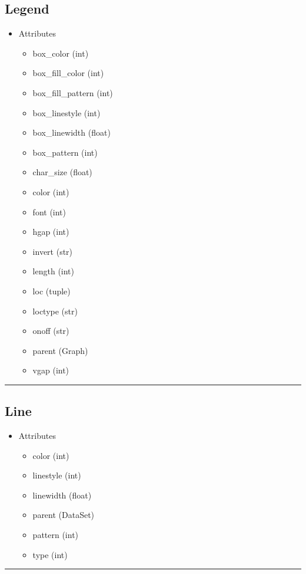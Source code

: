 \documentclass[10pt]{article}
\begin{document}
\begin{multicols}{4}
\subsection*{\footnotesize Legend}
\begin{itemize}
\item Attributes
\begin{itemize}
\item box\_color (int)
\item box\_fill\_color (int)
\item box\_fill\_pattern (int)
\item box\_linestyle (int)
\item box\_linewidth (float)
\item box\_pattern (int)
\item char\_size (float)
\item color (int)
\item font (int)
\item hgap (int)
\item invert (str)
\item length (int)
\item loc (tuple)
\item loctype (str)
\item onoff (str)
\item parent (Graph)
\item vgap (int)
\end{itemize}
\end{itemize}
\vspace{0.5em}
\hrule
\vspace{0.1em}
\subsection*{\footnotesize Line}
\begin{itemize}
\item Attributes
\begin{itemize}
\item color (int)
\item linestyle (int)
\item linewidth (float)
\item parent (DataSet)
\item pattern (int)
\item type (int)
\end{itemize}
\end{itemize}
\vspace{0.5em}
\hrule
\vspace{0.1em}

\end{multicols}
\end{document}
